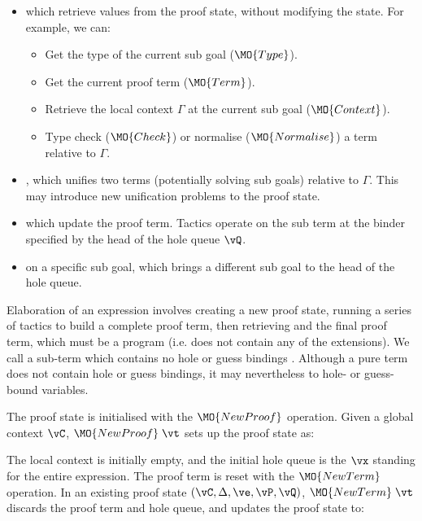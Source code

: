 \begin{itemize}
\item {} which retrieve values from the proof state, without modifying
the state. For example, we can:
\begin{itemize}
\item Get the type of the current sub goal ($\MO{Type}$).
\item Get the current proof term ($\MO{Term}$).
\item Retrieve the local context $\Gamma$ at the current sub goal
($\MO{Context}$).
\item Type check ($\MO{Check}$) or normalise ($\MO{Normalise}$) a term relative
to $\Gamma$.
\end{itemize}
\item {}, which unifies two terms (potentially solving sub
goals) relative to $\Gamma$. This may introduce new unification problems
to the proof state.
\item {} which update the proof term. Tactics operate on the sub term
at the binder specified by the head of the hole queue $\vQ$.
\item {} on a specific sub goal, which brings a different sub goal to the
head of the hole queue.
\end{itemize}

Elaboration of an \Idris{} expression involves creating a new proof state,
running a series of tactics to build a complete proof term, then retrieving and
 the final proof term, which must be a \TT{} program (i.e.
does not contain any of the \TTdev{} extensions). We call a sub-term which
contains no hole or guess bindings . Although a pure term does not
contain hole or guess bindings, it may nevertheless  to hole- or
guess-bound variables.

The proof state is initialised with the $\MO{NewProof}$ operation. Given a
global context $\vC$, $\MO{NewProof}\;\vt$ sets up the proof state as:

\DM{
(\vC, \cdot, \hole{\vx}{\vt}\SC\vx, \langle\rangle, \langle\vx\rangle)
}

The local context is initially empty, and the initial hole queue is the $\vx$ standing for
the entire expression. The proof term is reset with the $\MO{NewTerm}$ operation.
In an existing proof state $(\vC, \Delta, \ve, \vP, \vQ)$,
$\MO{NewTerm}\;\vt$ discards the proof term and hole queue, and
updates the proof state to:

